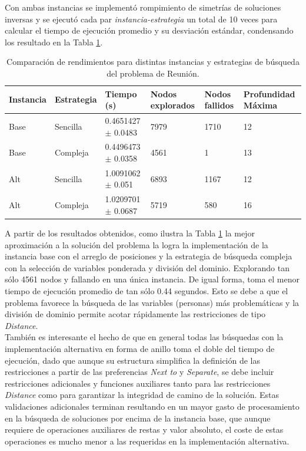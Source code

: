 Con ambas instancias se implementó rompimiento de simetrías de soluciones inversas y se ejecutó cada par \textit{instancia-estrategia} un total de 10 veces para calcular el tiempo de ejecución promedio y su desviación estándar, condensando los resultado en la Tabla \ref{tab:reunion_resultados}.

\begin{table}[htbp]
    \centering
\begin{tabularx}{\textwidth}{X X X X X X}
    \toprule
    \textbf{Instancia} & \textbf{Estrategia} & \textbf{Tiempo (s)} & \textbf{Nodos explorados} & \textbf{Nodos fallidos} & \textbf{Profundidad Máxima} \\
    \midrule
    Base & Sencilla & 0.4651427 $\pm$ 0.0483 & 7979 & 1710 & 12 \\
    Base & Compleja & 0.4496473 $\pm$ 0.0358 & 4561 & 1 & 13 \\
    Alt & Sencilla & 1.0091062 $\pm$ 0.051 & 6893 & 1167 & 12 \\
    Alt & Compleja & 1.0209701 $\pm$ 0.0687 & 5719 & 580 & 16 \\
    \bottomrule
\end{tabularx}
    \caption{Comparación de rendimientos para distintas instancias y estrategias de búsqueda del problema de Reunión.}
    \label{tab:reunion_resultados}
\end{table}

A partir de los resultados obtenidos, como ilustra la Tabla \ref{tab:reunion_resultados} la mejor aproximación a la solución del problema la logra la implementación de la instancia base con el arreglo de posiciones y la estrategia de búsqueda compleja con la selección de variables ponderada y división del dominio. Explorando tan sólo 4561 nodos y fallando en una única instancia. De igual forma, toma el menor tiempo de ejecución promedio  de tan sólo 0.44 segundos. Esto se debe a que el problema favorece la búsqueda de las variables (personas) más problemáticas y la división de dominio permite acotar rápidamente las restricciones de tipo \textit{Distance}.\\

También es interesante el hecho de que en general todas las búsquedas con la implementación alternativa en forma de anillo toma el doble del tiempo de ejecución, dado que aunque su estructura simplifica la definición de las restricciones a partir de las preferencias \textit{Next to} y \textit{Separate}, se debe incluir restricciones adicionales y funciones auxiliares tanto para las restricciones \textit{Distance} como para garantizar la integridad de camino de la solución. Estas validaciones adicionales terminan resultando en un mayor gasto de procesamiento en la búsqueda de soluciones por encima de la instancia base, que aunque requiere de operaciones auxiliares de restas y valor absoluto, el coste de estas operaciones es mucho menor a las requeridas en la implementación alternativa.\\

